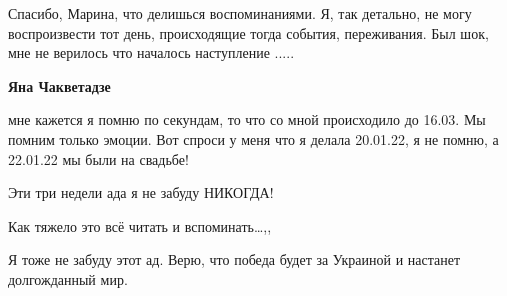  
 
 
 
 

\qqSecCmt


Спасибо, Марина, что делишься воспоминаниями. Я, так детально, не могу
воспроизвести тот день, происходящие тогда события, переживания. Был шок, мне
не верилось что началось наступление .....

\begin{itemize} %
\textbf{Яна Чакветадзе} 

мне кажется я помню по секундам, то что со мной происходило до 16.03. Мы помним
только эмоции. Вот спроси у меня что я делала 20.01.22, я не помню, а 22.01.22
мы были на свадьбе!

Эти три недели ада я не забуду НИКОГДА!
\end{itemize} %


Как тяжело это всё читать и вспоминать…,,


Я тоже не забуду этот ад. Верю, что победа будет за Украиной и настанет долгожданный мир.
